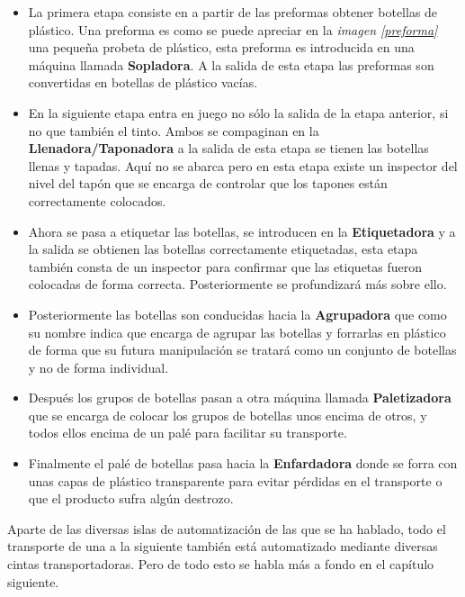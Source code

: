 \documentclass[11pt,a4paper,spanish,twoside]{report}
\begin{document}
\begin{itemize}
\item La primera etapa consiste en a partir de las preformas obtener botellas de
  plástico. Una preforma es como se puede apreciar en la \emph{imagen  
  \ref{preforma}} una pequeña probeta de plástico, esta preforma es
  introducida en una máquina llamada \textbf{Sopladora}. A la salida de esta etapa las
  preformas son convertidas en botellas de plástico vacías.

\item En la siguiente etapa entra en juego no sólo la salida de la etapa
  anterior, si no que también el tinto. Ambos se compaginan en la
  \textbf{Llenadora/Taponadora} a la salida de esta etapa se tienen las
  botellas llenas y tapadas. Aquí no se abarca pero en esta etapa existe un
  inspector del nivel del tapón que se encarga de controlar que los tapones
  están correctamente colocados.

\item Ahora se pasa a etiquetar las botellas, se introducen en la
  \textbf{Etiquetadora} y a la salida se obtienen las botellas correctamente
  etiquetadas, esta etapa también consta de un inspector para confirmar que
  las etiquetas fueron colocadas de forma correcta. Posteriormente se
  profundizará más sobre ello.

\item Posteriormente las botellas son conducidas hacia la \textbf{Agrupadora}
  que como su nombre indica que encarga de agrupar las botellas y forrarlas
  en plástico de forma que su futura manipulación se tratará como un conjunto
  de botellas y no de forma individual.

\item Después los grupos de botellas pasan a otra máquina llamada
  \textbf{Paletizadora} que se encarga de colocar los grupos de botellas unos
  encima de otros, y todos ellos encima de un palé para facilitar su
  transporte.
\item Finalmente el palé de botellas pasa hacia la \textbf{Enfardadora}
  donde se forra con unas capas de plástico transparente para evitar pérdidas
  en el transporte o que el producto sufra algún destrozo.

\end{itemize}
Aparte de las diversas islas de automatización de las que se ha hablado, todo
el transporte de una a la siguiente también está automatizado mediante diversas
cintas transportadoras. Pero de todo esto se habla más a fondo en el capítulo
siguiente. 
\end{document}
